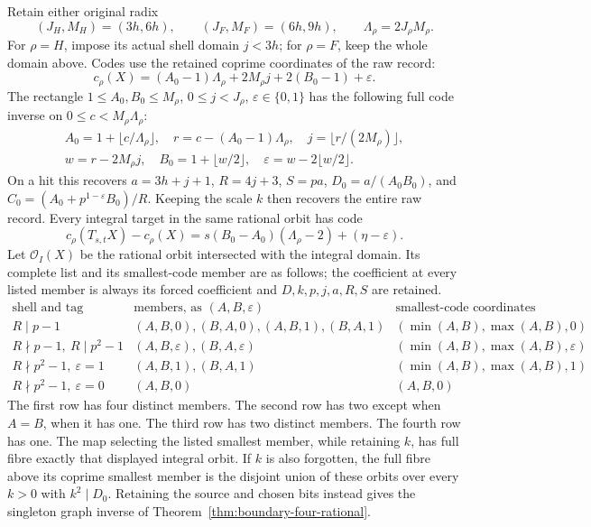 \begin{theorem}
\label{thm:boundary-orbit-code}
Retain either original radix
\[
 (J_H,M_H)=(3h,6h),\qquad (J_F,M_F)=(6h,9h),\qquad
 \Lambda_\rho=2J_\rho M_\rho.
\]
For \(\rho=H\), impose its actual shell domain \(j<3h\);
for \(\rho=F\), keep the whole domain above. Codes use the
retained coprime coordinates of the raw record:
\[
 c_\rho(X)=(A_0-1)\Lambda_\rho+2M_\rho j
                    +2(B_0-1)+\varepsilon.
\]
The rectangle \(1\le A_0,B_0\le M_\rho\),
\(0\le j<J_\rho\), \(\varepsilon\in\{0,1\}\) has
the following full code inverse on
\(0\le c<M_\rho\Lambda_\rho\):
\[
\begin{gathered}
 A_0=1+\lfloor c/\Lambda_\rho\rfloor,\quad
 r=c-(A_0-1)\Lambda_\rho,\quad
 j=\lfloor r/(2M_\rho)\rfloor,\\
 w=r-2M_\rho j,\quad B_0=1+\lfloor w/2\rfloor,\quad
 \varepsilon=w-2\lfloor w/2\rfloor.
\end{gathered}
\]
On a hit this recovers \(a=3h+j+1\), \(R=4j+3\),
\(S=pa\), \(D_0=a/(A_0B_0)\), and
\(C_0=(A_0+p^{1-\varepsilon}B_0)/R\).
Keeping the scale \(k\) then recovers the entire raw record.
Every integral target in the same rational orbit has code
\begin{equation}\label{eq:boundary-four-code-difference}
 c_\rho(T_{s,t}X)-c_\rho(X)
  =s(B_0-A_0)(\Lambda_\rho-2)+(\eta-\varepsilon).
\end{equation}
Let \(\mathcal O_I(X)\) be the rational orbit intersected with
the integral domain. Its complete list and its smallest-code member
are as follows; the coefficient at every listed member is always
its forced coefficient and \(D,k,p,j,a,R,S\) are retained.
\[
\begin{array}{c|c|c}
\text{shell and tag}&\text{members, as }(A,B,\varepsilon)&
                 \text{smallest-code coordinates}\\\hline
 R\mid p-1& (A,B,0),(B,A,0),(A,B,1),(B,A,1)&
               (\min(A,B),\max(A,B),0)\\
 R\nmid p-1,\ R\mid p^2-1&
              (A,B,\varepsilon),(B,A,\varepsilon)&
               (\min(A,B),\max(A,B),\varepsilon)\\
 R\nmid p^2-1,\ \varepsilon=1&(A,B,1),(B,A,1)&
               (\min(A,B),\max(A,B),1)\\
 R\nmid p^2-1,\ \varepsilon=0&(A,B,0)&(A,B,0)
\end{array}
\]
The first row has four distinct members. The second row has two
except when \(A=B\), when it has one. The third row has two
distinct members. The fourth row has one. The map selecting the
listed smallest member, while retaining \(k\), has full fibre
exactly that displayed integral orbit. If \(k\) is also forgotten,
the full fibre above its coprime smallest member is the disjoint
union of these orbits over every \(k>0\) with \(k^2\mid D_0\).
Retaining the source and chosen bits instead gives the singleton
graph inverse of Theorem~\ref{thm:boundary-four-rational}.


\end{theorem}
